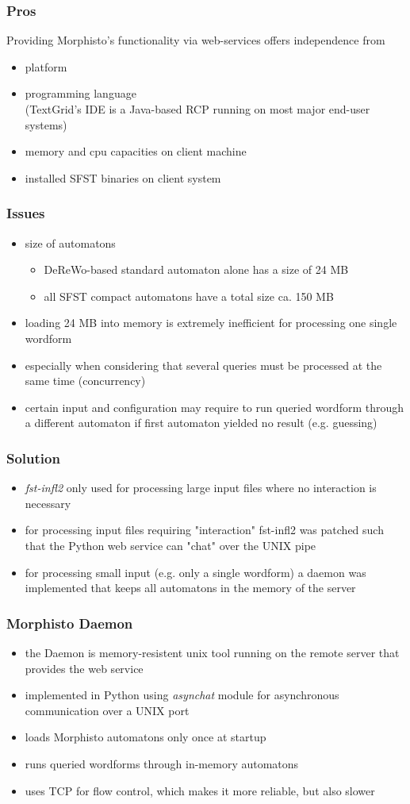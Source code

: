 \documentclass {beamer}
\begin{document}
\frame
{
	\frametitle{Pros}
	Providing Morphisto's functionality via web-services offers independence from
	\begin{itemize}
	\item platform
	\item programming language \\
	(TextGrid's IDE is a Java-based RCP running on most major end-user systems)
	\item memory and cpu capacities on client machine
	\item installed SFST binaries on client system
	\end{itemize}
}

\frame
{
	\frametitle{Issues}
	\begin{itemize}
	\item<1-> size of automatons
		\begin{itemize}
			\item{DeReWo-based standard automaton alone has a size of 24 MB} 
			\item{all SFST compact automatons have a total size ca. 150 MB}
		\end{itemize}
	\item<1-> loading 24 MB into memory is extremely inefficient for processing one single wordform
	\item<2-> especially when considering that several queries must be processed at the same time (concurrency)
	\item<3-> certain input and configuration may require to run queried wordform through a different automaton if first automaton yielded no result (e.g. guessing)
	\end{itemize}
}

\frame
{
	\frametitle{Solution}
	\begin{itemize}
		\item<1-> \textit{fst-infl2} only used for processing large input files where no interaction is necessary
		\item<2-> for processing input files requiring "interaction" fst-infl2 was patched such that the Python web service can "chat" over the UNIX pipe 
		\item<3-> for processing small input (e.g. only a single wordform) a daemon was implemented that keeps all automatons in the memory of the server
	\end{itemize}
}

\frame
{
	\frametitle{Morphisto Daemon}
	\begin{itemize}
	\item<1-> the Daemon is memory-resistent unix tool running on the remote server that provides the web service
	\item<2-> implemented in Python using \textit{asynchat} module for asynchronous communication over a UNIX port
	\item<3-> loads Morphisto automatons only once at startup 
	\item<4-> runs queried wordforms through in-memory automatons
	\item<5-> uses TCP for flow control, which makes it more reliable, but also slower
	\end{itemize}
}
\end{document}
